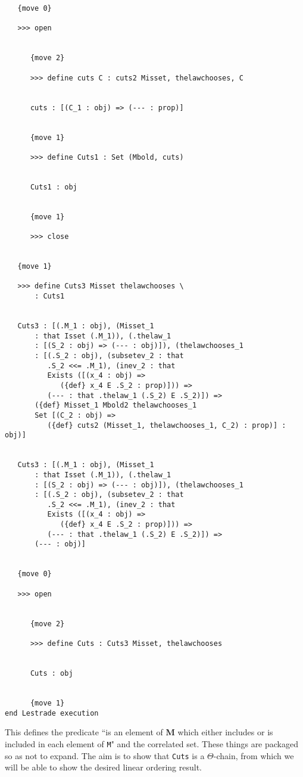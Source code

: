 \documentclass[12pt]{article}
\begin{document}
\begin{verbatim}
   {move 0}

   >>> open


      {move 2}

      >>> define cuts C : cuts2 Misset, thelawchooses, C


      cuts : [(C_1 : obj) => (--- : prop)]


      {move 1}

      >>> define Cuts1 : Set (Mbold, cuts)


      Cuts1 : obj


      {move 1}

      >>> close


   {move 1}

   >>> define Cuts3 Misset thelawchooses \
       : Cuts1


   Cuts3 : [(.M_1 : obj), (Misset_1 
       : that Isset (.M_1)), (.thelaw_1 
       : [(S_2 : obj) => (--- : obj)]), (thelawchooses_1 
       : [(.S_2 : obj), (subsetev_2 : that 
          .S_2 <<= .M_1), (inev_2 : that 
          Exists ([(x_4 : obj) => 
             ({def} x_4 E .S_2 : prop)])) => 
          (--- : that .thelaw_1 (.S_2) E .S_2)]) => 
       ({def} Misset_1 Mbold2 thelawchooses_1 
       Set [(C_2 : obj) => 
          ({def} cuts2 (Misset_1, thelawchooses_1, C_2) : prop)] : obj)]


   Cuts3 : [(.M_1 : obj), (Misset_1 
       : that Isset (.M_1)), (.thelaw_1 
       : [(S_2 : obj) => (--- : obj)]), (thelawchooses_1 
       : [(.S_2 : obj), (subsetev_2 : that 
          .S_2 <<= .M_1), (inev_2 : that 
          Exists ([(x_4 : obj) => 
             ({def} x_4 E .S_2 : prop)])) => 
          (--- : that .thelaw_1 (.S_2) E .S_2)]) => 
       (--- : obj)]


   {move 0}

   >>> open


      {move 2}

      >>> define Cuts : Cuts3 Misset, thelawchooses


      Cuts : obj


      {move 1}
end Lestrade execution
\end{verbatim}

This defines the predicate ``is an element of {\bf M} which either includes or is included in each element of {\tt M}" and the correlated set.  These things are packaged so as not to expand.
The aim is to show that {\tt Cuts} is a $\Theta$-chain, from which we will be able to show the desired linear ordering result.
\end{document}

